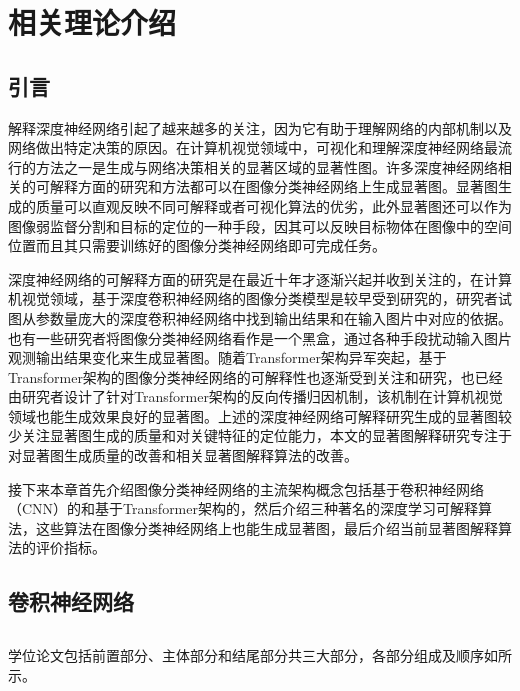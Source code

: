 


\chapter{相关理论介绍
}
\thispagestyle{others}
\pagestyle{others}
\xiaosi

\section{引言}
解释深度神经网络引起了越来越多的关注，因为它有助于理解网络的内部机制以及网络做出特定决策的原因。在计算机视觉领域中，可视化和理解深度神经网络最流行的方法之一是生成与网络决策相关的显著区域的显著性图。许多深度神经网络相关的可解释方面的研究和方法都可以在图像分类神经网络上生成显著图。显著图生成的质量可以直观反映不同可解释或者可视化算法的优劣，此外显著图还可以作为图像弱监督分割和目标的定位的一种手段，因其可以反映目标物体在图像中的空间位置而且其只需要训练好的图像分类神经网络即可完成任务。


深度神经网络的可解释方面的研究是在最近十年才逐渐兴起并收到关注的，在计算机视觉领域，基于深度卷积神经网络的图像分类模型是较早受到研究的，研究者试图从参数量庞大的深度卷积神经网络中找到输出结果和在输入图片中对应的依据。也有一些研究者将图像分类神经网络看作是一个黑盒，通过各种手段扰动输入图片观测输出结果变化来生成显著图。随着Transformer架构异军突起，基于Transformer架构的图像分类神经网络的可解释性也逐渐受到关注和研究，也已经由研究者设计了针对Transformer架构的反向传播归因机制，该机制在计算机视觉领域也能生成效果良好的显著图。上述的深度神经网络可解释研究生成的显著图较少关注显著图生成的质量和对关键特征的定位能力，本文的显著图解释研究专注于对显著图生成质量的改善和相关显著图解释算法的改善。

接下来本章首先介绍图像分类神经网络的主流架构概念包括基于卷积神经网络（CNN）的和基于Transformer架构的，然后介绍三种著名的深度学习可解释算法，这些算法在图像分类神经网络上也能生成显著图，最后介绍当前显著图解释算法的评价指标。

\section{卷积神经网络 }

\section{}

学位论文包括前置部分、主体部分和结尾部分共三大部分，各部分组成及顺序如所示。

